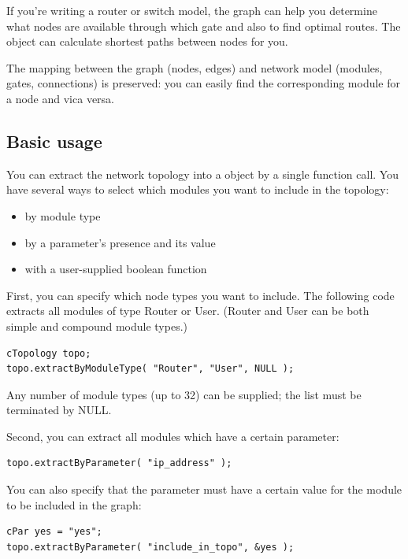 If you're writing a router or switch model, the 
graph can help you determine what nodes are available through which
gate and also to find optimal routes. The
 object can calculate shortest paths between nodes for you.

The mapping between the graph (nodes, edges) and network model
(modules, gates, connections) is preserved: you can easily find
the corresponding module for a  node and vica versa.





\subsection{Basic usage}

You can extract the network topology into a 
object by a single function call. You have several ways to select
which modules you want to include in the topology:
\begin{itemize}
  \item{by module type}
  \item{by a parameter's presence and its value}
  \item{with a user-supplied boolean function}
\end{itemize}

First, you can specify which node types you want to include. The
following code extracts all modules of type Router or User. (Router
and User can be both simple and compound module types.)

\begin{verbatim}
cTopology topo;
topo.extractByModuleType( "Router", "User", NULL );
\end{verbatim}


Any number of module types (up to 32) can be supplied; the list
must be terminated by NULL.

Second, you can extract all modules which have a certain parameter:

\begin{verbatim}
topo.extractByParameter( "ip_address" );
\end{verbatim}


You can also specify that the parameter must have a certain value
for the module to be included in the graph:

\begin{verbatim}
cPar yes = "yes";
topo.extractByParameter( "include_in_topo", &yes );
\end{verbatim}

